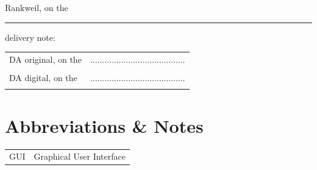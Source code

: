 	\par Rankweil, on the \PrintDate \\		
	
	\noindent\rule{\textwidth}{0.4pt}
	delivery note:
	\linebreak
	
	\begin{tabular}{p{7cm}C{6cm}}
		\hspace{1cm} DA original, on the \PrintDate & ........................................ \\ 
		& \supervisor \\ [2.5em]
		
		\hspace{1cm} DA digital, on the \PrintDate & ........................................ \\ 
		& \supervisor \\
	\end{tabular}
	
	
	\pagebreak
	\thispagestyle{empty}
	\cleardoublepage
	\pagebreak
	
	\SecAuth{\studentN} %
	
	\fancyfoot[LE,RO]{\thepage}
	\fancyfoot[LO,RE]{\DADate~\textbar~\pjname~\textbar ~\@SecAuth}
	\renewcommand{\footrulewidth}{0.4pt} %
	
	
	
	
	
	
	\pagebreak
	
	\section*{Abbreviations \& Notes}
	\begin{singlespace}	
		\begin{tabular}{ll}
			GUI    & Graphical User Interface \\
		\end{tabular}
	\end{singlespace}
	
	\pagebreak
	
	
	\singlespacing %
	\renewcommand{\listoffigures}{\begingroup
		\tocsection
		\endgroup}
	\listoffigures %
	\pagebreak
	
